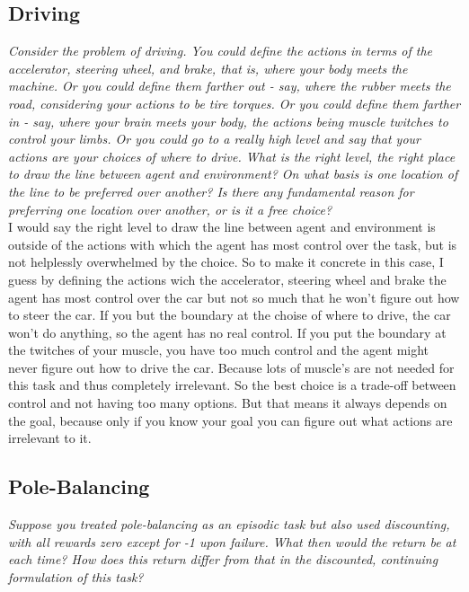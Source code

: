 \documentclass[12pt,a4paper]{article}
\begin{document}
\subsection{Driving}
\textit{Consider the problem of driving. You could define the actions in terms of the accelerator, steering wheel, and brake, that is, where your body meets the machine. Or you could define them farther out - say, where the rubber meets the road, considering your actions to be tire torques. Or you could define them farther in - say, where your brain meets your body, the actions being muscle twitches to control your limbs. Or you could go to a really high level and say that your actions are your choices of where to drive. What is the right level, the right place to draw the line between agent and environment? On what basis is one location of the line to be preferred over another? Is there any fundamental reason for preferring one location over another, or is it a free choice?}\\

I would say the right level to draw the line between agent and environment is outside of the actions with which the agent has most control over the task, but is not helplessly overwhelmed by the choice. So to make it concrete in this case, I guess by defining the actions wich the accelerator, steering wheel and brake the agent has most control over the car but not so much that he won't figure out how to steer the car. If you but the boundary at the choise of where to drive, the car won't do anything, so the agent has no real control. If you put the boundary at the twitches of your muscle, you have too much control and the agent might never figure out how to drive the car. Because lots of muscle's are not needed for this task and thus completely irrelevant. So the best choice is a trade-off between control and not having too many options. But that means it always depends on the goal, because only if you know your goal you can figure out what actions are irrelevant to it. 

\subsection{Pole-Balancing}
\textit{Suppose you treated pole-balancing as an episodic task but also used discounting, with all rewards zero except for -1 upon failure. What then would the return be at each time? How does this return differ from that in the discounted, continuing formulation of this task?}\\ 
\end{document}
